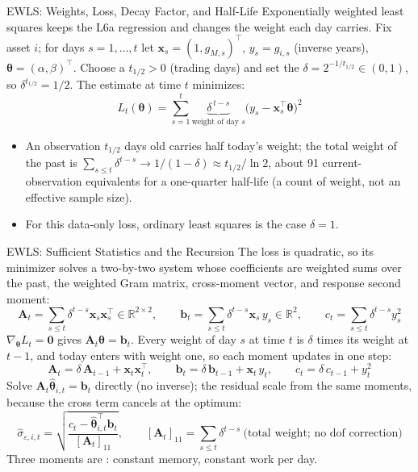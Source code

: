 \documentclass[aspectratio=169,11pt]{beamer}
\newcommand{\R}{\mathbb{R}}
\newcommand{\bx}{\mathbf{x}}
\newcommand{\bA}{\mathbf{A}}
\newcommand{\bb}{\mathbf{b}}
\newcommand{\bth}{\boldsymbol{\theta}}
\newcommand{\thalf}{t_{1/2}}
\begin{document}
\begin{frame}{EWLS: Weights, Loss, Decay Factor, and Half-Life}
  Exponentially weighted least squares keeps the L6a regression and changes the
  weight each day carries. Fix asset $i$; for days $s=1,\ldots,t$ let
  $\bx_s=(1,g_{M,s})^{\top}$, $y_s=g_{i,s}$ (inverse years), $\bth=(\alpha,\beta)^{\top}$.
  Choose a  $\thalf>0$ (trading days) and set the  $\delta=2^{-1/\thalf}\in(0,1)$, so $\delta^{\thalf}=1/2$. The estimate at
  time $t$ minimizes:
  \[
    \boxed{L_t(\bth)=\sum_{s=1}^{t}\underbrace{\delta^{\,t-s}}_{\text{weight of day }s}
      \bigl(y_s-\bx_s^{\top}\bth\bigr)^2}
  \]
  \begin{itemize}\setlength{\itemsep}{0.2em}
    \item An observation $\thalf$ days old carries half today's weight; the total
      weight of the past is $\sum_{s\le t}\delta^{t-s}\to1/(1-\delta)\approx\thalf/\ln2$,
      about 91 current-observation equivalents for a one-quarter half-life (a
      count of weight, not an effective sample size).
    \item For this data-only loss, ordinary least squares is the case $\delta=1$.
  \end{itemize}
\end{frame}

\begin{frame}{EWLS: Sufficient Statistics and the Recursion}
  \vspace{-0.3em}
  The loss is quadratic, so its minimizer solves a two-by-two system whose
  coefficients are weighted sums over the past, the weighted Gram matrix,
  cross-moment vector, and response second moment:
  \[
    \bA_t=\sum_{s\le t}\delta^{t-s}\bx_s\bx_s^{\top}\in\R^{2\times2},\qquad
    \bb_t=\sum_{s\le t}\delta^{t-s}\bx_s\,y_s\in\R^{2},\qquad
    c_t=\sum_{s\le t}\delta^{t-s}y_s^2
  \]
  $\nabla_{\bth}L_t=\mathbf 0$ gives $\bA_t\bth=\bb_t$. Every weight of day $s$ at
  time $t$ is $\delta$ times its weight at $t-1$, and today enters with weight one,
  so each moment updates in one step:
  \[
    \boxed{\bA_t=\delta\,\bA_{t-1}+\bx_t\bx_t^{\top},\qquad
      \bb_t=\delta\,\bb_{t-1}+\bx_t\,y_t,\qquad
      c_t=\delta\,c_{t-1}+y_t^2}
  \]
  Solve $\bA_t\hat{\bth}_{i,t}=\bb_t$ directly (no inverse); the residual scale
  from the same moments, because the cross term cancels at the optimum:
  \[
    \hat\sigma_{\varepsilon,i,t}=\sqrt{\frac{c_t-\hat{\bth}_{i,t}^{\top}\bb_t}{[\bA_t]_{11}}},
    \qquad [\bA_t]_{11}=\textstyle\sum_{s\le t}\delta^{t-s}\ \text{(total weight; no dof correction)}
  \]
  \vspace{-0.9em}
  Three moments are : constant memory, constant work per day.
\end{frame}
\end{document}
